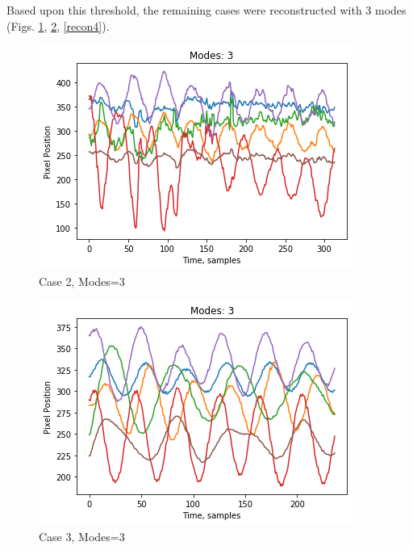 \documentclass[journal]{IEEEtran}
\begin{document}
Based upon this threshold, the remaining cases were reconstructed with 3 modes (Figs. \ref{recon2},
\ref{recon3}, \ref{recon4}).
\begin{figure}
	\centerline{\includegraphics[width=\columnwidth]{recon2.png}}
	\caption{Case 2, Modes=3}
	\label{recon2}
\end{figure}
\begin{figure}
	\centerline{\includegraphics[width=\columnwidth]{recon3.png}}
	\caption{Case 3, Modes=3}
	\label{recon3}
\end{figure}
\end{document}
